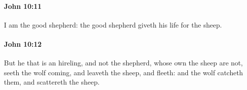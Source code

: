 		\paragraph{John 10:11} %
			\label{JOHN-10-11}

			I am the good shepherd: the good shepherd giveth his life for the sheep.

			\begin{framed}
				\scriptsize
				\begin{compactdesc}
					\item[SBLG] 
				\end{compactdesc}
			\end{framed}

		\paragraph{John 10:12} %
			\label{JOHN-10-12}

			But he that is an hireling, and not the shepherd, whose own the sheep are not, seeth the wolf coming, and leaveth the sheep, and fleeth: and the wolf catcheth them, and scattereth the sheep.

